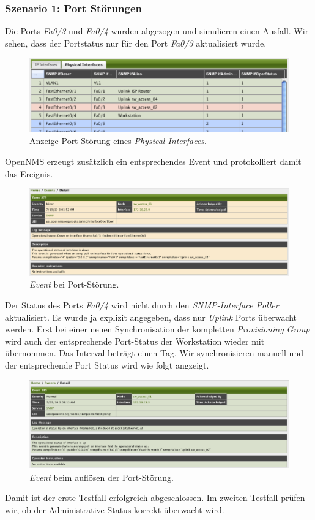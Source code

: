 \subsubsection{Szenario 1: Port Störungen}
Die Ports \emph{Fa0/3} und \emph{Fa0/4} wurden abgezogen und simulieren einen Ausfall. Wir sehen, dass der Portstatus nur für den Port \emph{Fa0/3} aktualisiert wurde.
\begin{figure}[H]
	\centering
	\includegraphics[width=1.0\textwidth]{images/use-cases/monitoring-layer-2/port-outage}
	\caption{Anzeige Port Störung eines \emph{Physical Interfaces}.}
	\label{pic:port-outage-snmpifpoller}
\end{figure}
OpenNMS erzeugt zusätzlich ein entsprechendes Event und protokolliert damit das Ereignis.
\begin{figure}[H]
	\centering
	\includegraphics[width=1.0\textwidth]{images/use-cases/monitoring-layer-2/port-down-event}
	\caption{\emph{Event} bei Port-Störung.}
	\label{pic:port-down-event}
\end{figure}
Der Status des Ports \emph{Fa0/4} wird nicht durch den \emph{SNMP-Interface Poller} aktualisiert. Es wurde ja explizit angegeben, dass nur \emph{Uplink} Ports überwacht werden. Erst bei einer neuen Synchronisation der kompletten \emph{Provisioning Group} wird auch der entsprechende Port-Status der Workstation wieder mit übernommen. Das Interval beträgt einen Tag. Wir synchronisieren manuell und der entsprechende Port Status wird wie folgt angzeigt.
\begin{figure}[H]
	\centering
	\includegraphics[width=1.0\textwidth]{images/use-cases/monitoring-layer-2/port-up-event}
	\caption{\emph{Event} beim auflösen der Port-Störung.}
	\label{pic:port-up-event}
\end{figure}
Damit ist der erste Testfall erfolgreich abgeschlossen. Im zweiten Testfall prüfen wir, ob der Administrative Status korrekt überwacht wird.


